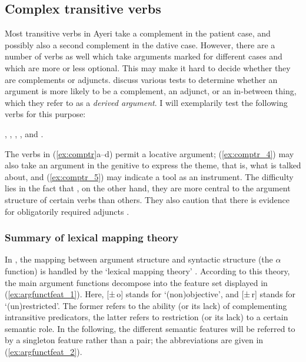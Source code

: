 \subsection{Complex transitive verbs}
\label{subsec:compltr}

Most transitive verbs in Ayeri take a complement in the patient case, and
possibly also a second complement in the dative case. However, there are a
number of verbs as well which take arguments marked for different cases and
which are more or less optional. This may make it hard to decide whether they
are complements or adjuncts. \citet{needhamtoivonen2011} discuss various tests
to determine whether an argument is more likely to be a complement, an adjunct,
or an in-between thing, which they refer to as a \emph{derived argument}. I
will exemplarily test the following verbs for this purpose:

\pex\label{ex:comptr}
\a\label{ex:comptr_1}%
	,
\a\label{ex:comptr_2}%
		,
\a\label{ex:comptr_3}%
	,
\a\label{ex:comptr_4}%
	, and
\a\label{ex:comptr_5}%
	.
\xe

The verbs in (\ref{ex:comptr}a--d) permit a locative argument;
(\ref{ex:comptr_4}) may also take an argument in the genitive to express the
theme, that is, what is talked about, and (\ref{ex:comptr_5}) may indicate a
tool as an instrument. The difficulty lies in the fact that , on the
other hand, they are more central to the argument structure of certain verbs
than others. They also caution that there is evidence for obligatorily required
adjuncts \citep[406]{needhamtoivonen2011}.

\subsubsection{Summary of lexical mapping theory}

In \Lfg{}, the mapping between argument structure and syntactic structure (the
$\alpha$ function) is handled by the `lexical mapping theory'
\citep[324\psqq]{bresnan2016}. According to this theory, the main argument
functions decompose into the feature set displayed in
(\ref{ex:argfunctfeat_1}). Here, [±\,o] stands for `(non)objective', and [±\,r]
stands for `(un)restricted'. The former refers to the ability (or its lack) of
complementing intransitive predicators, the latter refers to restriction (or
its lack) to a certain semantic role. In the following, the different semantic
features will be referred to by a singleton feature rather than a pair; the
abbreviations are given in (\ref{ex:argfunctfeat_2}).

